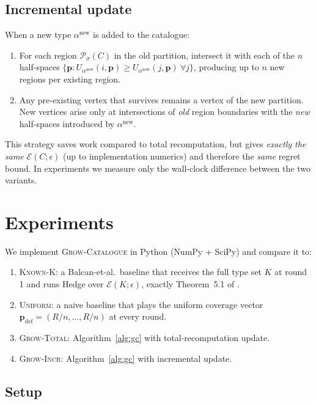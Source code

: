 \documentclass[11pt]{article}
\newcommand{\pvec}{\mathbf{p}}
\newcommand{\cE}{\mathcal{E}}
\newcommand{\cP}{\mathcal{P}}
\begin{document}
\subsection{Incremental update}

When a new type $\alpha^{\mathrm{new}}$ is added to the catalogue:
\begin{enumerate}[leftmargin=*]
  \item For each region $\cP_\sigma(C)$ in the old partition, intersect it with each of the $n$ half-spaces $\{\pvec : U_{\alpha^{\mathrm{new}}}(i,\pvec) \ge U_{\alpha^{\mathrm{new}}}(j,\pvec)\ \forall j\}$, producing up to $n$ new regions per existing region.
  \item Any pre-existing vertex that survives remains a vertex of the new partition. New vertices arise only at intersections of \emph{old} region boundaries with the \emph{new} half-spaces introduced by $\alpha^{\mathrm{new}}$.
\end{enumerate}
This strategy saves work compared to total recomputation, but gives \emph{exactly the same} $\cE(C;\epsilon)$ (up to implementation numerics) and therefore the \emph{same} regret bound. In experiments we measure only the wall-clock difference between the two variants.

\section{Experiments}
\label{sec:exp}

We implement \textsc{Grow-Catalogue} in Python (NumPy + SciPy) and compare it to:
\begin{enumerate}[leftmargin=*]
  \item \textsc{Known-K}: a Balcan-et-al.\ baseline that receives the full type set $K$ at round 1 and runs Hedge over $\cE(K;\epsilon)$, exactly Theorem~5.1 of \cite{balcan2015}.
  \item \textsc{Uniform}: a naive baseline that plays the uniform coverage vector $\pvec_{\mathrm{def}} = (R/n, \dots, R/n)$ at every round.
  \item \textsc{Grow-Total}: Algorithm~\ref{alg:gc} with total-recomputation update.
  \item \textsc{Grow-Incr}: Algorithm~\ref{alg:gc} with incremental update.
\end{enumerate}

\subsection{Setup}
\end{document}
